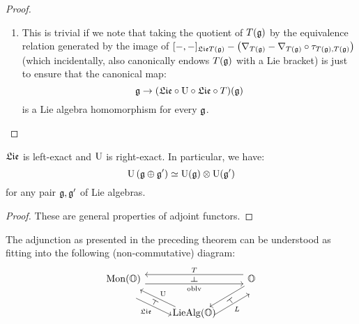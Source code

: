 \begin{proof}
\begin{enumerate}
                        \item This is trivial if we note that taking the quotient of $T(\mathfrak{g})$ by the equivalence relation generated by the image of $[-,-]_{\mathfrak{Lie} T(\mathfrak{g})} - \left(\nabla_{T(\mathfrak{g})} - \nabla_{T(\mathfrak{g})} \circ \tau_{T(\mathfrak{g}), T(\mathfrak{g})}\right)$ (which incidentally, also canonically endows $T(\mathfrak{g})$ with a Lie bracket) is just to ensure that the canonical map:
                            $$\mathfrak{g} \to (\mathfrak{Lie} \circ \mathrm{U} \circ \mathfrak{Lie} \circ T)(\mathfrak{g})$$
                        is a Lie algebra homomorphism for every $\mathfrak{g}$.
                    \end{enumerate}
                \end{proof}
            \begin{corollary}
                $\mathfrak{Lie}$ is left-exact and $\mathrm{U}$ is right-exact. In particular, we have:
                    $$\U\left(\g \oplus \g'\right) \cong \U(\g) \tensor \U(\g')$$
                for any pair $\mathfrak{g}, \mathfrak{g}'$ of Lie algebras. 
            \end{corollary}
                \begin{proof}
                    These are general properties of adjoint functors.
                \end{proof}
            \begin{remark}
                The adjunction as presented in the preceding theorem can be understood as fitting into the following (non-commutative) diagram:
                    $$
                        \begin{tikzcd}
                        	{\Mon(\O)} & {} & {\O} \\
                        	& {\Lie\Alg(\O)}
                        	\arrow["{\oblv}"{name=0, swap}, from=1-1, to=1-3, shift right=2]
                        	\arrow["{T}"{name=1, swap}, from=1-3, to=1-1, shift right=2]
                        	\arrow["{L}"{name=2, swap}, from=2-2, to=1-3, shift right=5]
                        	\arrow[""{name=3, inner sep=0}, from=1-3, to=2-2, shift left=1]
                        	\arrow["{\U}"{name=4, swap}, from=2-2, to=1-1, shift left=1]
                        	\arrow["{\frakLie}"{name=5, swap}, from=1-1, to=2-2, shift right=5]
                        	\arrow["\dashv"{rotate=-90}, from=1, to=0, phantom]
                        	\arrow["\dashv"{rotate=61}, from=5, to=4, phantom]
                        	\arrow["\dashv"{rotate=129}, from=2, to=3, phantom]
                        \end{tikzcd}
                    $$
            \end{remark}
